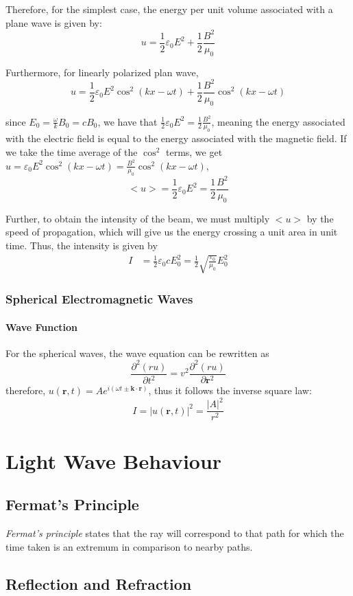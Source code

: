 \documentclass[openany]{book}
\begin{document}
Therefore, for the simplest case, the energy per unit volume associated with a plane wave is given by:
\[u=\frac{1}{2}\varepsilon _0E^2+\frac{1}{2}\frac{B^2}{\mu _0}\]

Furthermore, for linearly polarized plan wave,
\[u=\frac{1}{2}\varepsilon _0E^2\cos ^2(kx-\omega t)+\frac{1}{2}\frac{B^2}{\mu _0}\cos ^2(kx-\omega t)\] 

since $E_0=\frac{\omega }{k}B_0=cB_0$, we have that $\frac{1}{2}\varepsilon _0E^2=\frac{1}{2}\frac{B^2}{\mu _0}$, meaning the energy associated with the electric field is equal to the energy associated with the magnetic field. If we take the time average of the $\cos ^2$ terms, we get $u=\varepsilon _0E^2\cos ^2(kx-\omega t)=\frac{B^2}{\mu _0}\cos ^2(kx-\omega t)$,
\[<u>=\frac{1}{2}\varepsilon _0E^2=\frac{1}{2}\frac{B^2}{\mu _0}\]

Further, to obtain the intensity of the beam, we must multiply $<u>$ by the speed of propagation, which will give us the energy crossing a unit area in unit time. Thus, the intensity is given by
\begin{align*}
I&=\frac{1}{2}\varepsilon _0cE_0^2=\frac{1}{2}\sqrt{\frac{\varepsilon _0}{\mu _0}}E_0^2
\end{align*}

\subsection{Spherical Electromagnetic Waves}
\subsubsection{Wave Function}
For the spherical waves, the wave equation can be rewritten as
\[\frac{\partial ^2(ru)}{\partial t^2}=v^2\frac{\partial ^2(ru)}{\partial \mathbf{r}^2}\]
therefore, $u(\mathbf{r},t)=Ae^{i(\omega t\pm \mathbf{k}\cdot \mathbf{r})}$, thus it follows the inverse square law:
\[I=|u(\mathbf{r},t)|^2=\frac{|A|^2}{r^2}\]
\chapter{Light Wave Behaviour}
\section{Fermat’s Principle}
\emph{Fermat's principle} states that the ray will correspond to that path for which the time taken is an extremum in comparison to nearby paths.
\section{Reflection and Refraction}
\end{document}
